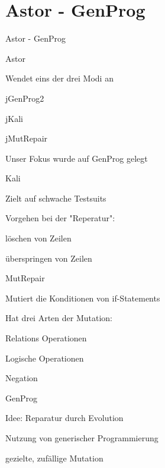 \section{Astor \-- GenProg}
%
\begin{frame}{}
	\begin{center}
		\huge{Astor \-- GenProg}
	\end{center}
\end{frame}
%
\begin{frame}{Astor}
	\begin{itemizes}{1em}
		\item Wendet eins der drei Modi an
		\begin{itemizes}{0.2em}
			\item jGenProg2
			\item jKali
			\item jMutRepair
		\end{itemizes}
		\item Unser Fokus wurde auf GenProg gelegt
	\end{itemizes}
\end{frame}
%
\begin{frame}{Kali}
	\begin{itemizes}{1em}
		\item Zielt auf schwache Testsuits
		\item Vorgehen bei der "{}Reperatur":
		\begin{itemizes}{0.2em}
			\item löschen von Zeilen
			\item überspringen von Zeilen
		\end{itemizes}
	\end{itemizes}
\end{frame}
%
\begin{frame}{MutRepair}
	\begin{itemizes}{1em}
		\item Mutiert die Konditionen von if-Statements
		\item Hat drei Arten der Mutation:
		\begin{itemizes}{0.2em}
			\item Relations Operationen
			\item Logische Operationen
			\item Negation
		\end{itemizes}
	\end{itemizes}
\end{frame}
%
\begin{frame}{GenProg}
	\begin{itemizes}{1em}
		\item Idee: Reparatur durch Evolution
		\begin{itemizes}{1em}
			\item Nutzung von generischer Programmierung
			\item gezielte, zufällige Mutation
		\end{itemizes}
	\end{itemizes}
\end{frame}
